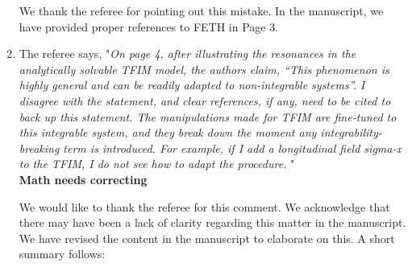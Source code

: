 \documentclass[aps,prb,reprint,showpacs,floatfix,superscriptaddress, onecolumn, nofootinbib, 9pt]{revtex4-2}
\newcommand{\response}[1]{{\color{blue}#1}} %
\begin{document}
\begin{enumerate}
		\response{
			We thank the referee for pointing out this mistake. In the manuscript, we have provided proper references to FETH in Page 3.
		}
		
		\item The referee says, "\textit{On page 4, after illustrating the resonances in the analytically solvable TFIM model, the authors claim, “This phenomenon is highly general and can be readily adapted to non-integrable systems”. I disagree with the statement, and clear references, if any, need to be cited to back up this statement. The manipulations made for TFIM are fine-tuned to this integrable system, and they break down the moment any integrability-breaking term is introduced. For example, if I add a longitudinal field sigma-x to the TFIM, I do not see how to adapt the procedure. }"\\
		\textbf{Math needs correcting}
		\response{ We would like to thank the referee for this comment. We acknowledge that there may have been a lack of clarity regarding this matter in the manuscript. We have revised the content in the manuscript to elaborate on this. A short summary follows:
			
}
\end{enumerate}
\end{document}
